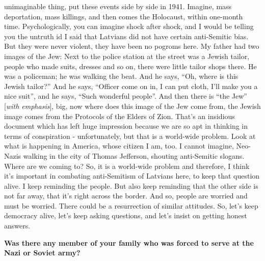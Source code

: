 unimaginable thing, put these events side by side in 1941. Imagine, mass deportation, mass killings, and then comes the Holocaust, within one-month time. Psychologically, you can imagine shock after shock, and I would be telling you the untruth id I said that Latvians did not have certain anti-Semitic bias. But they were never violent, they have been no pogroms here. My father had two images of the Jew: Next to the police station at the street was a Jewish tailor, people who made suits, dresses and so on, there were little tailor shops there. He was a policeman; he was walking the beat. And he says, ``Oh, where is this Jewish tailor?'' And he says, ``Officer come on in, I can put cloth, I’ll make you a nice suit'', and he says, ``Such wonderful people''. And then there is ``the Jew'' [\textit{with emphasis}], big, now where does this image of the Jew come from, the Jewish image comes from the Protocols of the Elders of Zion. That’s an insidious document which has left huge impression because we are so apt in thinking in terms of conspiration - unfortunately, but that is a world-wide problem. Look at what is happening in America, whose citizen I am, too. I cannot imagine, Neo-Nazis walking in the city of Thomas Jefferson, shouting anti-Semitic slogans. Where are we coming to? So, it is a world-wide problem and therefore, I think it’s important in combating anti-Semitism of Latvians here, to keep that question alive. I keep reminding the people. But also keep reminding that the other side is not far away, that it’s right across the border. And so, people are worried and must be worried. There could be a resurrection of similar attitudes. So, let’s keep democracy alive, let’s keep asking questions, and let’s insist on getting honest answers.

\textbf{Was there any member of your family who was forced to serve at the Nazi or Soviet army?}

